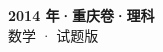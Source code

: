 \documentclass[zihao=-4, a4paper]{ctexart}
\begin{document}
\begin{center}
  {\Large\bfseries 2014 年·重庆卷·理科}\\[4pt]
  {\large 数学 · 试题版}
\end{center}
\medskip
{}

\end{document}
